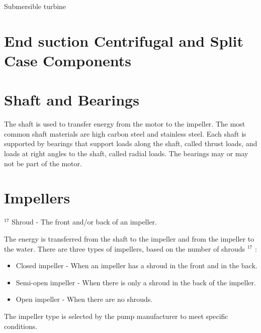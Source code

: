 \documentclass[10pt]{article}
\begin{document}
Submersible turbine

\section{End suction Centrifugal and Split Case Components}
\section{Shaft and Bearings}
The shaft is used to transfer energy from the motor to the impeller. The most common shaft materials are high carbon steel and stainless steel. Each shaft is supported by bearings that support loads along the shaft, called thrust loads, and loads at right angles to the shaft, called radial loads. The bearings may or may not be part of the motor.

\section{Impellers}
${ }^{17}$ Shroud - The front and/or back of an impeller.

The energy is transferred from the shaft to the impeller and from the impeller to the water. There are three types of impellers, based on the number of shrouds ${ }^{17}$ :

\begin{itemize}
  \item Closed impeller - When an impeller has a shroud in the front and in the back.

  \item Semi-open impeller - When there is only a shroud in the back of the impeller.

  \item Open impeller - When there are no shrouds.

\end{itemize}
The impeller type is selected by the pump manufacturer to meet specific conditions.
\end{document}
